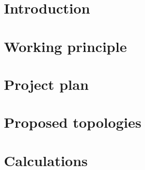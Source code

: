 \section*{Introduction} 
\label{sec:intro}


\pagebreak      %
\section{Working principle}
\label{sec:principle}



\pagebreak      %
\section{Project plan}
\label{sec:plan}


\pagebreak      %
\section{Proposed topologies}
\label{sec:topologies}



\pagebreak      %
\section{Calculations}
\label{sec:calculations}







\pagebreak      %
% 
